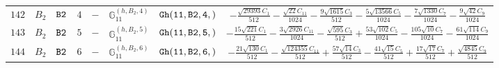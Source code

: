 \documentclass[fleqn,8pt]{jsarticle}
\begin{document}
\begin{table}[ht!]
\begin{center}
\begin{tabular}{cccccccc}
$ 142 $ & $ B_{2} $ & $ {\tt B2} $ & $ 4 $ & $ - $ & $ \mathbb{G}_{11}^{(h,B_{2},4)} $ & $ {\tt Gh(11,B2,4,)} $ & $ - \frac{\sqrt{29393} C_{1}}{512} - \frac{\sqrt{22} C_{11}}{1024} - \frac{9 \sqrt{1615} C_{3}}{512} - \frac{5 \sqrt{13566} C_{5}}{1024} - \frac{7 \sqrt{1330} C_{7}}{1024} - \frac{9 \sqrt{42} C_{9}}{1024} $ \\
$ 143 $ & $ B_{2} $ & $ {\tt B2} $ & $ 5 $ & $ - $ & $ \mathbb{G}_{11}^{(h,B_{2},5)} $ & $ {\tt Gh(11,B2,5,)} $ & $ - \frac{15 \sqrt{221} C_{1}}{512} - \frac{3 \sqrt{2926} C_{11}}{1024} - \frac{\sqrt{595} C_{3}}{512} + \frac{53 \sqrt{102} C_{5}}{1024} - \frac{105 \sqrt{10} C_{7}}{1024} - \frac{61 \sqrt{114} C_{9}}{1024} $ \\
$ 144 $ & $ B_{2} $ & $ {\tt B2} $ & $ 6 $ & $ - $ & $ \mathbb{G}_{11}^{(h,B_{2},6)} $ & $ {\tt Gh(11,B2,6,)} $ & $ - \frac{21 \sqrt{130} C_{1}}{512} - \frac{\sqrt{124355} C_{11}}{512} + \frac{57 \sqrt{14} C_{3}}{512} - \frac{41 \sqrt{15} C_{5}}{512} + \frac{17 \sqrt{17} C_{7}}{512} + \frac{\sqrt{4845} C_{9}}{512} $ \\
 \hline \hline
\end{tabular}
\end{center}
\end{table}
\end{document}
